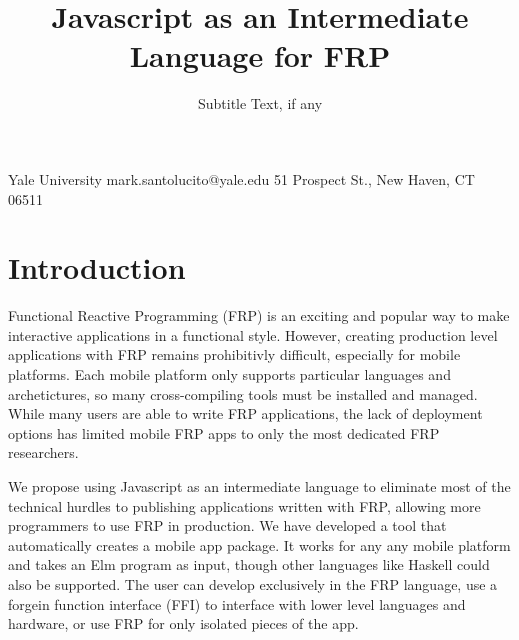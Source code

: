 \documentclass[preprint]{sigplanconf}
\begin{document}
\setlength{\pdfpageheight}{\paperheight}
\setlength{\pdfpagewidth}{\paperwidth}






\title{Javascript as an Intermediate Language for FRP}
\subtitle{Subtitle Text, if any}

           {Yale University}
           {mark.santolucito@yale.edu}
           {51 Prospect St., New Haven, CT 06511}

\maketitle

\section{Introduction}

Functional Reactive Programming (FRP) is an exciting and popular way to make interactive applications in a functional style.
However, creating production level applications with FRP remains prohibitivly difficult, especially for mobile platforms.
Each mobile platform only supports particular languages and archetictures, so many cross-compiling tools must be installed and managed.
While many users are able to write FRP applications, the lack of deployment options has limited mobile FRP apps to only the most dedicated FRP researchers.

We propose using Javascript as an intermediate language to eliminate most of the technical hurdles to publishing applications written with FRP, allowing more programmers to use FRP in production.
We have developed a tool that automatically creates a mobile app package.
It works for any any mobile platform and takes an Elm program as input, though other languages like Haskell could also be supported.
The user can develop exclusively in the FRP language, use a forgein function interface (FFI) to interface with lower level languages and hardware, or use FRP for only isolated pieces of the app.
\end{document}
